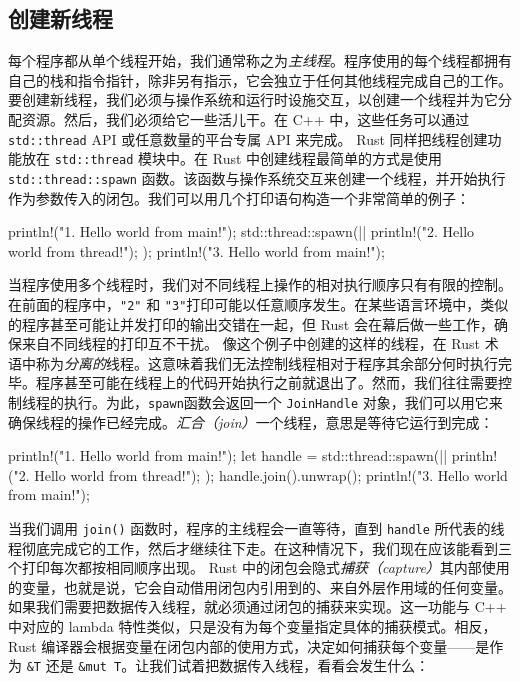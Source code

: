 \subsection{创建新线程}
\label{idx:idx_e6318b15}
每个程序都从单个线程开始，我们通常称之为\emph{主线程}。程序使用的每个线程都拥有自己的栈和指令指针，除非另有指示，它会独立于任何其他线程完成自己的工作。要创建新线程，我们必须与操作系统和运行时设施交互，以创建一个线程并为它分配资源。然后，我们必须给它一些活儿干。在 C++ 中，这些任务可以通过 \texttt{std::thread} API 或任意数量的平台专属 API 来完成。
Rust 同样把线程创建功能放在 \texttt{std::thread} 模块中。在 Rust 中创建线程最简单的方式是使用 \texttt{std::\allowbreak{}thread::\allowbreak{}spawn} 函数。该函数与操作系统交互来创建一个线程，并开始执行作为参数传入的闭包。我们可以用几个打印语句构造一个非常简单的例子：
\begin{codebox}[rust]
println!("1. Hello world from main!");
std::thread::spawn(|| {
    println!("2. Hello world from thread!");
});
println!("3. Hello world from main!");
\end{codebox}
当程序使用多个线程时，我们对不同线程上操作的相对执行顺序只有有限的控制。在前面的程序中，\texttt{"2"} 和 \texttt{"3"}打印可能以任意顺序发生。在某些语言环境中，类似的程序甚至可能让并发打印的输出交错在一起，但 Rust 会在幕后做一些工作，确保来自不同线程的打印互不干扰。
\label{idx:idx_df2ffab8}
像这个例子中创建的这样的线程，在 Rust 术语中称为\emph{分离的}线程。这意味着我们无法控制线程相对于程序其余部分何时执行完毕。程序甚至可能在线程上的代码开始执行之前就退出了。然而，我们往往需要控制线程的执行。为此，\texttt{spawn}函数会返回一个 \texttt{JoinHandle} 对象，我们可以用它来确保线程的操作已经完成。\emph{汇合（join）}一个线程，意思是等待它运行到完成：
\begin{codebox}[rust]
println!("1. Hello world from main!");
let handle = std::thread::spawn(|| {
    println!("2. Hello world from thread!");
});
handle.join().unwrap();
println!("3. Hello world from main!");
\end{codebox}
当我们调用 \texttt{join()} 函数时，程序的主线程会一直等待，直到 \texttt{handle} 所代表的线程彻底完成它的工作，然后才继续往下走。在这种情况下，我们现在应该能看到三个打印每次都按相同顺序出现。
Rust 中的闭包会隐式\emph{捕获（capture）}其内部使用的变量，也就是说，它会自动借用闭包内引用到的、来自外层作用域的任何变量。如果我们需要把数据传入线程，就必须通过闭包的捕获来实现。这一功能与 C++ 中对应的 lambda 特性类似，只是没有为每个变量指定具体的捕获模式。相反，Rust 编译器会根据变量在闭包内部的使用方式，决定如何捕获每个变量——是作为 \texttt{\&T} 还是 \texttt{\&mut T}。让我们试着把数据传入线程，看看会发生什么：
